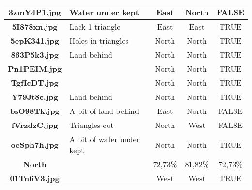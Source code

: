 \documentclass{article}
\begin{document}
\begin{table}[h!]
{\begin{tabular}{|c|p{4cm}|c|c|c|}
            \textbf{3zmY4P1.jpg} & Water under kept             & East                          & North                            & FALSE                \\ \hline
            \rowcolor{gray!0}
            \textbf{5I878xn.jpg} & Lack 1 triangle              & East                          & East                             & TRUE                 \\ \hline
            \rowcolor{gray!10}
            \textbf{5epK341.jpg} & Holes in triangles           & North                         & North                            & TRUE                 \\ \hline
            \rowcolor{gray!0}
            \textbf{863P5k3.jpg} & Land behind                  & North                         & North                            & TRUE                 \\ \hline
            \rowcolor{gray!10}
            \textbf{Pn1PEIM.jpg} &                              & North                         & North                            & TRUE                 \\ \hline
            \rowcolor{gray!0}
            \textbf{TgfIcDT.jpg} &                              & North                         & North                            & TRUE                 \\ \hline
            \rowcolor{gray!10}
            \textbf{Y79Jt8c.jpg} & Land behind                  & North                         & North                            & TRUE                 \\ \hline
            \rowcolor{gray!0}
            \textbf{bsO98Tk.jpg} & A bit of land behind         & East                          & North                            & FALSE                \\ \hline
            \rowcolor{gray!10}
            \textbf{fVrzdzC.jpg} & Triangles cut                & North                         & West                             & FALSE                \\ \hline
            \rowcolor{gray!0}
            \textbf{oeSph7h.jpg} & A bit of water under kept    & North                         & North                            & TRUE                 \\ \hline
            \rowcolor{gray!40}
            \textbf{North}       &                              & 72,73\%                       & 81,82\%                          & 72,73\%              \\ \hline
            \rowcolor{gray!0}
            \textbf{01Tn6V3.jpg} &                              & West                          & West                             & TRUE                 \\ \hline

\end{tabular}}
\end{table}
\end{document}
